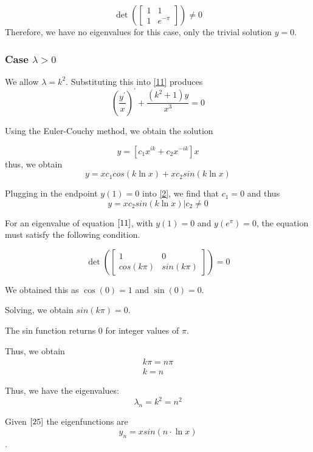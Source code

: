 \documentclass{article}
\begin{document}
$$\det \left( \begin{bmatrix} 1 & 1 \\ 1 & e^{-\pi} \end{bmatrix} \right) \neq 0$$
Therefore, we have no eigenvalues for this case, only the trivial solution $y=0$.

\subsubsection*{Case $\lambda > 0$}

We allow $\lambda = k^2$.
Substituting this into \eqref{11} produces
$$ \left(\frac{y^{'}}{x}\right)^{'} + \frac{\left(k^2 + 1\right)y}{x^3} = 0 $$

Using the Euler-Couchy method, we obtain the solution

$$ y= \left[ c_1 x^{ik} + c_2 x^{-ik}\right] x $$
thus, we obtain
\begin{equation}\label{2}y = x c_1 cos\left(k \ln x \right) + x c_2 sin\left( k \ln x \right)\end{equation}

Plugging in the endpoint $y(1)=0$ into \eqref{2}, we find that $c_1=0$ and thus
\begin{equation}\label{25}
y = x c_2 sin\left(k \ln x \right)\Bigr| c_2 \neq 0
\end{equation}

For an eigenvalue of equation $\eqref{11}$, with $y(1) = 0$ and $y(e^\pi) = 0$, the equation must satisfy the following condition.

$$
\det \left( \begin{bmatrix} 1 & 0 \\ cos(k\pi) & sin(k\pi) \end{bmatrix} \right) = 0
$$

We obtained this as $\cos(0) = 1$ and $\sin(0) = 0$.

Solving, we obtain $sin(k\pi) = 0$.

The sin function returns 0 for integer values of $\pi$.

Thus, we obtain
\begin{align*}k\pi = n\pi \\
k = n
\end{align*}

Thus, we have the eigenvalues:
$$\lambda_{n} = k^2 = n^2$$

Given $\eqref{25}$ the eigenfunctions are
$$ y_n = x sin \left( n\cdot \ln x \right ) $$.

\pagebreak
\end{document}
